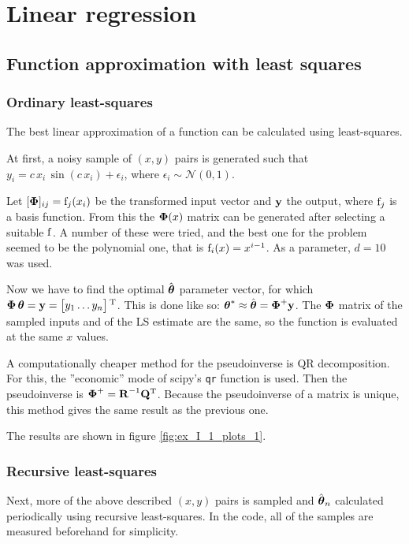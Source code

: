 \section{Linear regression}

\subsection{Function approximation with least squares}


\subsubsection{Ordinary least-squares}

The best linear approximation of a function can be calculated using least-squares.

At first, a noisy sample of $(x, y)$ pairs is generated such that
$y_i = c\,x_i\,\sin(c\,x_i) + \epsilon_i$, where $\epsilon_i\sim\mathcal{N}(0,1)$.

Let $[\boldsymbol{\mathrm{\Phi}}]_{ij}=\mathrm{f}_j(x_i)$ be the transformed input vector and $\boldsymbol{\mathrm{y}}$ the output,
where $\mathrm{f}_j$ is a basis function.
From this the $\boldsymbol{\mathrm{\Phi}}(x)$ matrix can be generated
after selecting a suitable $\mathrm{f}$. A number of these were tried, and the best one for
the problem seemed to be the polynomial one, that is $\mathrm{f}_{i}(x) = x^{i-1}$.
As a parameter, $d=10$ was used.

Now we have to find the optimal $\hat{\boldsymbol{\mathrm{\theta}}}$ parameter vector,
for which $\boldsymbol{\mathrm{\Phi}}\,\boldsymbol{\mathrm{\theta}}=\boldsymbol{\mathrm{y}}=\begin{bmatrix}y_1\dots y_n\end{bmatrix}\textsuperscript{T}$.
This is done like so: $\boldsymbol{\mathrm{\theta}}^*\approx\hat{\boldsymbol{\mathrm{\theta}}}=\boldsymbol{\mathrm{\Phi}}^+\boldsymbol{\mathrm{y}}$.
The $\boldsymbol{\mathrm{\Phi}}$ matrix of the sampled inputs and of the LS estimate are the same,
so the function is evaluated at the same $x$ values.

A computationally cheaper method for the pseudoinverse is QR decomposition. For this,
the ''economic'' mode of scipy's \verb|qr| function is used.
Then the pseudoinverse is $\boldsymbol{\mathrm{\Phi}}^+=\boldsymbol{\mathrm{R}}^{-1}\boldsymbol{\mathrm{Q}}\textsuperscript{T}$.
Because the pseudoinverse of a matrix is unique,
this method gives the same result as the previous one.

The results are shown in figure \ref{fig:ex_I_1_plots_1}.

\subsubsection{Recursive least-squares}

Next, more of the above described $(x, y)$ pairs is sampled and $\hat{\boldsymbol{\mathrm{\theta}}}_{n}$ calculated periodically using recursive least-squares. In the code, all of the samples are measured beforehand for simplicity.

